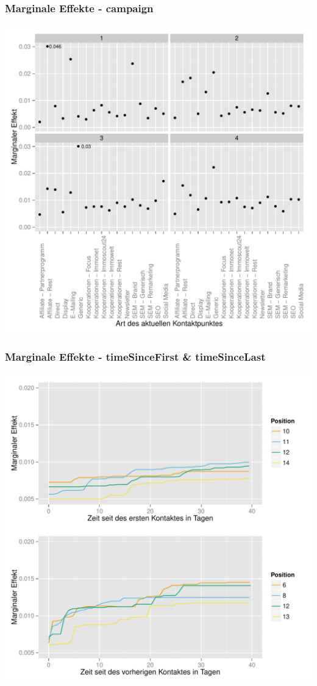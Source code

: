 \begin{frame}\frametitle{Marginale Effekte - campaign}
	\centering\includegraphics[scale=0.39]{marg_eff_campaign.pdf}
\end{frame}


\begin{frame}\frametitle{Marginale Effekte - timeSinceFirst \& timeSinceLast}
	\centering\includegraphics[scale=0.39]{marg_eff_time.pdf}
\end{frame}


